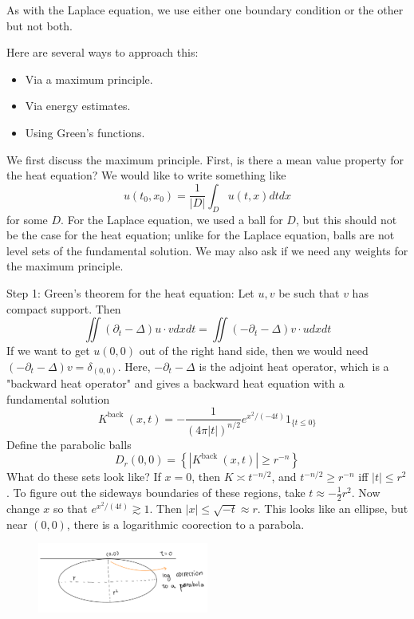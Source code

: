 As with the Laplace equation, we use either one boundary condition or the other but not both.

Here are several ways to approach this:
\begin{itemize}
    \item Via a maximum principle.
    \item Via energy estimates.
    \item Using Green's functions.
\end{itemize}
We first discuss the maximum principle. First, is there a mean value property for the heat equation? We would like to write something like
$$
u\left(t_{0}, x_{0}\right)=\frac{1}{|D|} \int_{D} u(t, x) dt d x
$$
for some $D$. For the Laplace equation, we used a ball for $D$, but this should not be the case for the heat equation; unlike for the Laplace equation, balls are not level sets of the fundamental solution. We may also ask if we need any weights for the maximum principle.

Step 1: Green's theorem for the heat equation: Let $u,v$ be such that $v$ has compact support. Then 
$$
\iint\left(\partial_{t}-\Delta\right) u \cdot v d x d t=\iint\left(-\partial_{t}-\Delta\right) v \cdot u d x d t
$$
If we want to get $u(0,0)$ out of the right hand side, then we would need $\left(-\partial_{t}-\Delta\right) v=\delta_{(0,0)}$. Here, $-\partial_{t}-\Delta$ is the adjoint heat operator, which is a "backward heat operator" and gives a backward heat equation with a fundamental solution
\[
    K^{\text {back }}(x, t)=-\frac{1}{(4 \pi|t|)^{n / 2}} e^{x^{2} /(-4 t)} 1_{\{t \leq 0\}}
\]
Define the parabolic balls
$$
D_{r}(0,0)=\left\{\left|K^{\text {back }}(x, t)\right| \ge r^{-n}\right\}
$$
What do these sets look like? If $x=0$, then $K \asymp t^{-n / 2}$, and $t^{-n / 2} \geq r^{-n}$ iff $|t| \leq r^{2}$. To figure out the sideways boundaries of these regions, take $t \approx -\frac{1}{2} r^{2}$. Now change $x$ so that $e^{x^{2} /(4 t)} \gtrsim 1$. Then $|x| \leq \sqrt{-t} \approx r$. This looks like an ellipse, but near $(0,0)$, there is a logarithmic coorection to a parabola.

\begin{figure}[H]
    \centering
    \includegraphics[width=0.5\textwidth]{Pics/24-1.png}
\end{figure}

